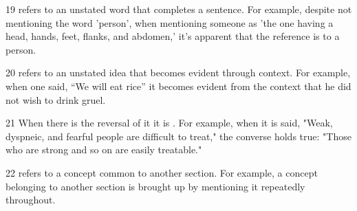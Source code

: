 \begin{translation}
\item [19]  refers to an unstated word that completes a sentence. For example, despite not mentioning the word 'person', when mentioning someone as 'the one having a head, hands, feet, flanks, and abdomen,' it's apparent that the reference is to a person. 

\item [20]  refers to an unstated idea that becomes evident through context. For example, when one said, “We will eat rice” it becomes evident from the context that he did not wish to drink gruel. 

\item [21] When there is the reversal of it it is . For example, when it is said, "Weak, dyspneic, and fearful people are difficult to treat," the converse holds true: "Those who are strong and so on are easily treatable." 

\item [22]  refers to a concept common to another section. For example, a concept belonging to another section is brought up by mentioning it repeatedly throughout. 


\end{translation}
